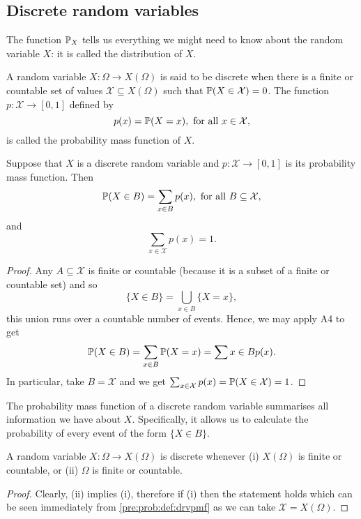 \documentclass[10pt, a4paper]{article}
\begin{document}
\subsection{Discrete random variables}
The function $\P_X$ tells us everything we might need to know about the random variable $X$: it is called the distribution of $X$.

\begin{definition}\label{pre:prob:def:drvpmf}
    A random variable $X : \Omega \rightarrow X(\Omega)$ is said to be discrete when there is a finite or countable set of values $\mathcal{X} \subseteq X(\Omega)$ such that $\P(X \in \mathcal{X}) = 0$.
    The function $p: \mathcal{X} \rightarrow [0, 1]$ defined by
    \[
    p(x) = \P(X = x),\text{ for all } x \in \mathcal{X},
    \]
    is called the probability mass function of $X$.
\end{definition}

\begin{theorem}
    Suppose that $X$ is a discrete random variable and $p : \mathcal{X} \rightarrow [0, 1]$ is its probability mass function. Then
    \[
    \P(X \in B) = \sum_{x \in B}p(x),\text{ for all } B \subseteq \mathcal{X},
    \]
    and
    \[
    \sum_{x \in \mathcal{X}}p(x) = 1.
    \]
    \begin{proof}
        Any $A \subseteq \mathcal{X}$ is finite or countable (because it is a subset of a finite or countable set) and so
        \[
        \{X \in B\} = \bigcup_{x \in B}\{X = x\},
        \]
        this union runs over a countable number of events.
        Hence, we may apply A4 to get
        \[
        \P(X \in B) = \sum_{x \in B}\P(X = x) = \sum{x \in B}p(x).
        \]
        In particular, take $B = \mathcal{X}$ and we get $\sum_{x \in \mathcal{X}}p(x) = \P(X \in \mathcal{X}) = 1$.
    \end{proof}
\end{theorem}
The probability mass function of a discrete random variable summarises all information we have about $X$.
Specifically, it allows us to calculate the probability of every event of the form $\{X \in B\}$.

\begin{theorem}
    A random variable $X : \Omega \rightarrow X(\Omega)$ is discrete whenever (i) $X(\Omega)$ is finite or countable,
    or (ii) $\Omega$ is finite or countable.
    \begin{proof}
        Clearly, (ii) implies (i),
        therefore if (i) then the statement holds which can be seen immediately from \autoref{pre:prob:def:drvpmf} as we can take $\mathcal{X} = X(\Omega)$.
    \end{proof}
\end{theorem}
\end{document}

